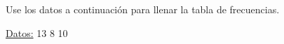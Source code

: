\documentclass{cdplf-prueba}
\begin{document}
\subsection{}

Use los datos a continuación para llenar la tabla de frecuencias.

\underline{Datos:} \hspace{4pt} 13 \hspace{4pt}\textbullet\hspace{4pt} 8 \hspace{4pt}\textbullet\hspace{4pt} 10 \hspac
\end{document}
